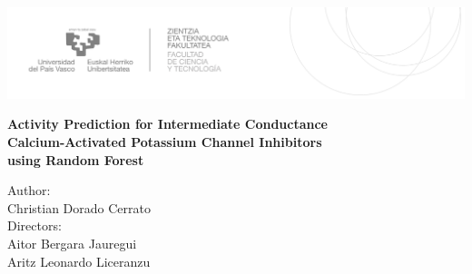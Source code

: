 \documentclass[12pt]{report}
\begin{document}

\begin{titlepage}
\hspace*{-3.5cm}
    \begin{minipage}{\textwidth}
        \vspace{-2.5cm}
        \begin{center}
    

            \includegraphics[width=\paperwidth]{LogoEHU.PNG}
        \end{center}
    \end{minipage}

\vspace{1cm}

\hspace{-3.1cm}
\noindent{}


\vspace{0.8cm}

\noindent\hspace*{-2.5cm}%
\colorbox{light-gray}{\begin{minipage}{\paperwidth}%

    \vspace{1cm}

    \color{RoyalBlue}
    \centering\Large\textbf{ Activity Prediction for Intermediate Conductance\\ Calcium-Activated Potassium Channel Inhibitors\\ using Random Forest}



    \vspace{7cm}\mbox{}
  \end{minipage}
}

\begin{flushright}
 Author:
\\
Christian Dorado Cerrato
\\
 Directors:
\\
Aitor Bergara Jauregui
\\
Aritz Leonardo Liceranzu


\end{flushright}
\end{titlepage}
\end{document}

